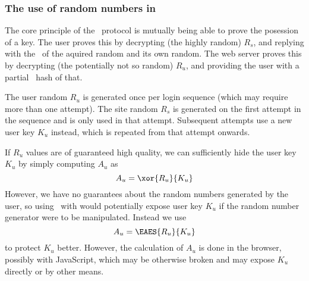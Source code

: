 \subsubsection{The use of random numbers in \TIMO}
The core principle of the \TIMO\ protocol is mutually being able to prove the posession of a key.
The user proves this by decrypting
(the highly random)
$R_s$,
and replying with the \XOR\ of the aquired random and its own random.
The web server proves this by decrypting
(the potentially not so random)
$R_u$,
and providing the user with a partial \SHA\ hash of that.
\par
The user random $R_u$ is generated once per login sequence
(which may require more than one attempt).
The site random $R_s$ is generated on the first attempt in the sequence
and is only used in that attempt.
Subsequent attempts use a new user key $K_u$ instead,
which is repeated from that attempt onwards.
\par
If $R_u$ values are of guaranteed high quality,
we can sufficiently hide the user key $K_u$ by simply computing $A_u$ as
\[A_u=\xor{R_u}{K_u}\]
However,
we have no guarantees about the random numbers generated by the user,
so using \XOR\ with would potentially expose user key $K_u$ if the random number generator were to be manipulated.
Instead we use 
\[A_u=\EAES{R_u}{K_u}\]
to protect $K_u$ better.
However, the calculation of $A_u$ is done in the browser,
possibly with JavaScript,
which may be otherwise broken and may expose $K_u$ directly or by other means.

